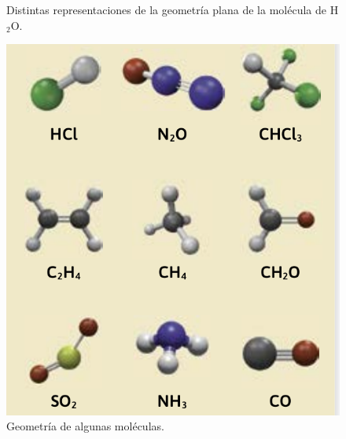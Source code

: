 \documentclass[12pt]{guia}
\begin{document}
\begin{opening}
{\begin{minipage}{.2\textwidth}
\begin{figure}[H]
                \caption{Distintas representaciones de la geometría plana de la molécula
                    de H$_2$O.}
                \label{fig:2.39}
            \end{figure}
        \end{minipage}
    }
\end{opening}
\begin{questions}
    
    \begin{minipage}{.4\textwidth}
        \begin{figure}[H]
            \centering
            \includegraphics[width=.85\linewidth]{../images/geometrias_moleculas}
            \caption{Geometría de algunas moléculas.}
            \label{fig:geometrias_moleculas}
        \end{figure}
    \end{minipage}\hfill
    \begin{minipage}{.55\textwidth}
        
    \end{minipage}
    
\end{questions}

\end{document}
